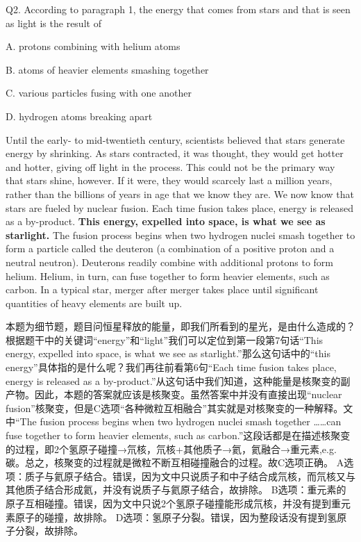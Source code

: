 \begin{blk}
    \begin{qst}
        Q2. According to paragraph 1, the energy that comes from stars and that is seen as light is the result of
    \end{qst}

    \begin{chc}
        A. protons combining with helium atoms

        B. atoms of heavier elements smashing together

        C. various particles fusing with one another

        D. hydrogen atoms breaking apart
    \end{chc}

    \begin{psgq}
        Until the early- to mid-twentieth century, scientists believed that stars generate energy by shrinking. As stars contracted, it was thought, they would get hotter and hotter, giving off light in the process. This could not be the primary way that stars shine, however. If it were, they would scarcely last a million years, rather than the billions of years in age that we know they are. We now know that stars are fueled by nuclear fusion. Each time fusion takes place, energy is released as a by-product. \textbf{This energy, expelled into space, is what we see as starlight.} The fusion process begins when two hydrogen nuclei smash together to form a particle called the deuteron (a combination of a positive proton and a neutral neutron). Deuterons readily combine with additional protons to form helium. Helium, in turn, can fuse together to form heavier elements, such as carbon. In a typical star, merger after merger takes place until significant quantities of heavy elements are built up.
    \end{psgq}

    \begin{nlz}
        本题为细节题，题目问恒星释放的能量，即我们所看到的星光，是由什么造成的？根据题干中的关键词“energy”和“light”我们可以定位到第一段第7句话“This energy, expelled into space, is what we see as starlight.”那么这句话中的“this energy”具体指的是什么呢？我们再往前看第6句“Each time fusion takes place, energy is released as a by-product.”从这句话中我们知道，这种能量是核聚变的副产物。因此，本题的答案就应该是核聚变。虽然答案中并没有直接出现“nuclear fusion”核聚变，但是C选项“各种微粒互相融合”其实就是对核聚变的一种解释。文中“The fusion process begins when two hydrogen nuclei smash together ……can fuse together to form heavier elements, such as carbon.”这段话都是在描述核聚变的过程，即2个氢原子碰撞→氘核，氘核+其他质子→氦，氦融合→重元素,e.g.碳。总之，核聚变的过程就是微粒不断互相碰撞融合的过程。故C选项正确。 A选项：质子与氦原子结合。错误，因为文中只说质子和中子结合成氘核，而氘核又与其他质子结合形成氦，并没有说质子与氦原子结合，故排除。 B选项：重元素的原子互相碰撞。错误，因为文中只说2个氢原子碰撞能形成氘核，并没有提到重元素原子的碰撞，故排除。 D选项：氢原子分裂。错误，因为整段话没有提到氢原子分裂，故排除。
    \end{nlz}
\end{blk}

